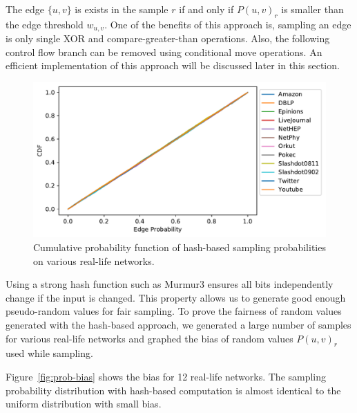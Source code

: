 \documentclass[10pt,journal,compsoc]{IEEEtran}
\begin{document}
The edge $\{u,v\}$ is exists in the sample $r$ if and only if  ${P}(u,v)_r$ is smaller than the edge threshold $w_{u,v}$. One of the benefits of this approach is, sampling an edge is only single XOR and compare-greater-than operations. Also, the following control flow branch can be removed using conditional move operations. 
An efficient implementation of this approach will be discussed later in this section.
\begin{figure}[!ht] 
    \centering
    \includegraphics[width=1\linewidth]{./images/CDF.pdf}
    \caption{Cumulative probability function of hash-based sampling probabilities on various real-life networks.}
    \label{fig:prob-cdf} 
\end{figure}
Using a strong hash function such as {{\sc Murmur3}} ensures all bits independently change if the input is changed. This property allows us to generate good enough pseudo-random values for fair sampling. To prove the fairness of random values generated with the hash-based approach, we generated a large number of samples for various real-life networks and graphed the bias of random values $P(u,v)_r$ used while sampling.

Figure~\ref{fig:prob-bias} shows the bias for 12 real-life networks. The sampling probability distribution with hash-based computation is almost identical to the uniform distribution with small bias.
\end{document}
